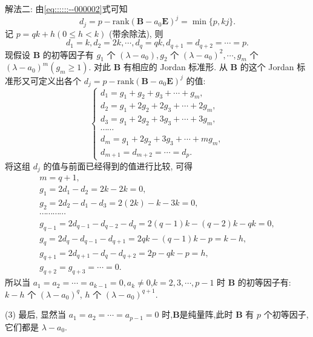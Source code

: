 \documentclass[../../main.tex]{subfiles}
\begin{document}
\begin{solution}
{\color{blue}解法二:}
由\eqref{eq::::::--000002}式可知
\[
d_j = p - \mathrm{rank}(\boldsymbol{B} - a_0\boldsymbol{E})^j = \min\{p, kj\}.
\]
记 $p = qk + h(0 \leqslant h < k)$ (带余除法), 则
\[
d_1 = k, d_2 = 2k, \cdots, d_q = qk, d_{q+1} = d_{q+2} = \cdots = p.
\]
现假设 $\boldsymbol{B}$ 的初等因子有 $g_1$ 个 $(\lambda - a_0), g_2$ 个 $(\lambda - a_0)^2, \cdots, g_m$ 个 $(\lambda - a_0)^m(g_m \geqslant 1)$. 对此 $\boldsymbol{B}$ 有相应的 Jordan 标准形. 从 $\boldsymbol{B}$ 的这个 Jordan 标准形又可定义出各个 $d_j = p - \mathrm{rank}(\boldsymbol{B} - a_0\boldsymbol{E})^j$ 的值:
\[
\begin{cases} 
d_1 = g_1 + g_2 + g_3 + \cdots + g_m, \\
d_2 = g_1 + 2g_2 + 2g_3 + \cdots + 2g_m, \\
d_3 = g_1 + 2g_2 + 3g_3 + \cdots + 3g_m, \\
\cdots \cdots \\
d_m = g_1 + 2g_2 + 3g_3 + \cdots + mg_m, \\
d_{m+1} = d_{m+2} = \cdots = d_p.
\end{cases}
\]
将这组 $d_j$ 的值与前面已经得到的值进行比较, 可得
\begin{gather*}
m=q+1,
\\
g_1=2d_1-d_2=2k-2k=0,
\\
g_2=2d_2-d_1-d_3=2(2k)-k-3k=0,
\\
\cdots \cdots \cdots \cdots 
\\
g_{q-1}=2d_{q-1}-d_{q-2}-d_q=2(q-1)k-(q-2)k-qk=0,
\\
g_q=2d_q-d_{q-1}-d_{q+1}=2qk-(q-1)k-p=k-h,
\\
g_{q+1}=2d_{q+1}-d_q-d_{q+2}=2p-qk-p=h,
\\
g_{q+2}=g_{q+3}=\cdots =0.
\end{gather*}
所以当 $a_1 = a_2 = \cdots = a_{k-1} = 0, a_k \neq 0$,$k=2,3,\cdots,p-1$ 时 $\boldsymbol{B}$ 的初等因子有: $k - h$ 个 $(\lambda - a_0)^q$, $h$ 个 $(\lambda - a_0)^{q+1}$.

(3) 最后, 显然当 $a_1 = a_2 = \cdots = a_{p-1} = 0$ 时,$\boldsymbol{B}$是纯量阵,此时 $\boldsymbol{B}$ 有 $p$ 个初等因子, 它们都是 $\lambda - a_0$.

\end{solution}
\end{document}
